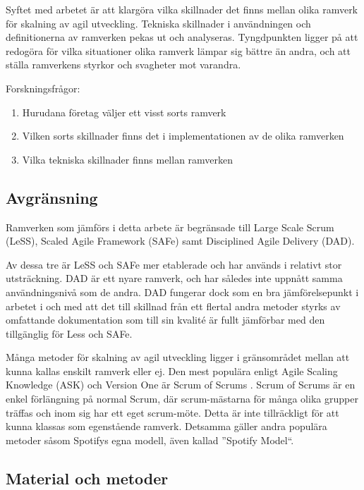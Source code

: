 		Syftet med arbetet är att klargöra vilka skillnader det finns mellan olika ramverk för skalning av agil utveckling. Tekniska skillnader i användningen och definitionerna av ramverken pekas ut och analyseras.
		Tyngdpunkten ligger på att redogöra för vilka situationer olika ramverk lämpar sig bättre än andra, och att ställa ramverkens styrkor och svagheter mot varandra. \newline
		
		Forskningsfrågor:
		\begin{enumerate}
			\item Hurudana företag väljer ett visst sorts ramverk
			\item Vilken sorts skillnader finns det i implementationen av de olika ramverken
			\item Vilka tekniska skillnader finns mellan ramverken
		\end{enumerate}
			
	
	\subsection{Avgränsning}
	
		Ramverken som jämförs i detta arbete är begränsade till Large Scale Scrum (LeSS), Scaled Agile Framework (SAFe) samt Disciplined Agile Delivery (DAD).
		
		Av dessa tre är LeSS och SAFe mer etablerade och har används i relativt stor utsträckning. DAD är ett nyare ramverk, och har således inte uppnått samma användningsnivå som de andra. DAD fungerar dock som en bra jämförelsepunkt i arbetet i och med att det till skillnad från ett flertal andra metoder styrks av omfattande dokumentation som till sin kvalité är fullt jämförbar med den tillgänglig för Less och SAFe.
		\cite{ask_matrix}
		
		Många metoder för skalning av agil utveckling ligger i gränsområdet mellan att kunna kallas enskilt ramverk eller ej. Den mest populära enligt Agile Scaling Knowledge (ASK) och Version One är Scrum of Scrums \cite{ask_matrix} \cite{version_one_report}. Scrum of Scrums är en enkel förlängning på normal Scrum, där scrum-mästarna för många olika grupper träffas och inom sig har ett eget scrum-möte. Detta är inte tillräckligt för att kunna klassas som egenstående ramverk. Detsamma gäller andra populära metoder såsom Spotifys egna modell, även kallad ''Spotify Model``.
		
	\subsection{Material och metoder}
		
